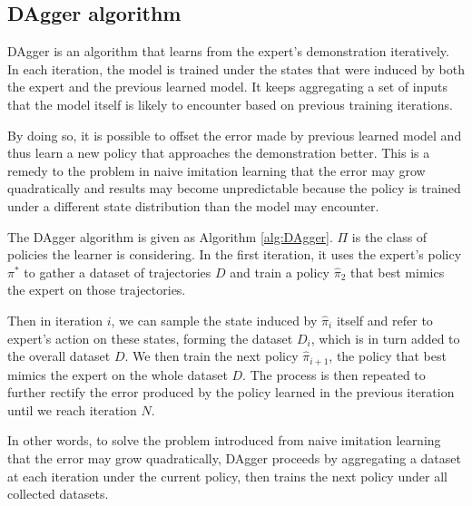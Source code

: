 \documentclass[twoside]{article}
\begin{document}


\subsection{DAgger algorithm}
DAgger is an algorithm that learns from the expert's demonstration iteratively. In each iteration, the model is trained under the states that were induced by both the expert and the previous learned model. It keeps aggregating a set of inputs that the model itself is likely to encounter based on previous training iterations.  

By doing so, it is possible to offset the error made by previous learned model and thus learn a new policy that approaches the demonstration better. This is a remedy to the problem in naive imitation learning that the error may grow quadratically and results may become unpredictable because the policy is trained under a different state distribution than the model may encounter. 

The DAgger algorithm is given as Algorithm \ref{alg:DAgger}.
$\Pi$ is the class of policies the learner is considering.
In the first iteration, it uses the expert's policy $\pi^*$ to gather
a dataset of trajectories $D$ and train a policy $\hat{\pi}_2$ that best mimics the expert on those trajectories. 

Then in iteration $i$, we can sample the state induced by $\hat{\pi}_i$ itself and refer to expert's action on these states, forming the dataset $D_i$, which is in turn added to the overall dataset $D$. We then train the next policy $\hat{\pi}_{i+1}$, the policy that best mimics the expert on the whole dataset $D$. The process is then repeated to further rectify the error produced by the policy learned in the previous iteration until we reach iteration $N$.

In other words, to solve the problem introduced from naive imitation learning that the error may grow quadratically, DAgger proceeds by aggregating a dataset at each iteration under the current policy, then trains the next policy under all collected datasets. 
\end{document}
